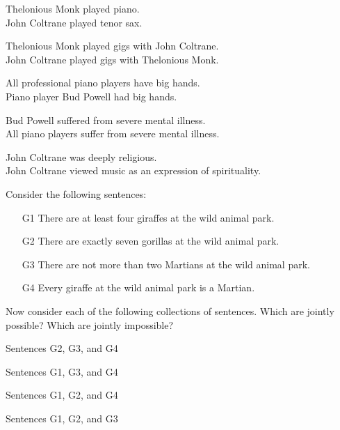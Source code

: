 \begin{practiceproblems}
\begin{earg}
\item  Thelonious Monk played piano.	\\
	John Coltrane played tenor sax.
\item  Thelonious Monk played gigs with John Coltrane.	\\
	John Coltrane played gigs with Thelonious Monk.
\item  All professional piano players have big hands.	\\
	Piano player Bud Powell had big hands.
\item  Bud Powell suffered from severe mental illness.	 \\
	All piano players suffer from severe mental illness.
\item John Coltrane was deeply religious.	 \\
John Coltrane viewed music as an expression of spirituality.
\end{earg}

\noindent \problempart Consider the following sentences:
\begin{enumerate}%
\item[G1] \label{itm:at_least_four}There are at least four giraffes at the wild animal park.
\item[G2] \label{itm:exactly_seven} There are exactly seven gorillas at the wild animal park.
\item[G3] \label{itm:not_more_than_two} There are not more than two Martians at the wild animal park.
\item[G4] \label{itm:martians} Every giraffe at the wild animal park is a Martian.
\end{enumerate}

Now consider each of the following collections of sentences. Which are jointly possible? Which are jointly impossible?
\begin{earg}
\item Sentences G2, G3, and G4
\item Sentences G1, G3, and G4
\item Sentences G1, G2, and G4
\item Sentences G1, G2, and G3
\end{earg}


\end{practiceproblems}
